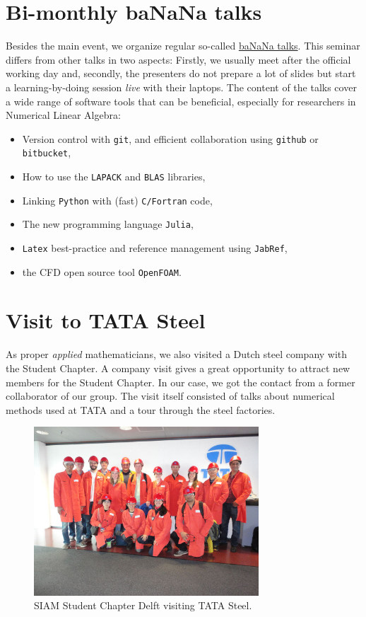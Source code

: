 \documentclass{article}
\begin{document}
 \section*{Bi-monthly ba\color{red}NaN\color{black}a talks}
 Besides the main event, we organize regular so-called \href{http://projectbanana.github.io/}{ba\color{red}NaN\color{black}a talks}. This seminar differs from other talks in two aspects: Firstly, we usually meet after the official working day and, secondly, the presenters do not prepare a lot of slides but start a learning-by-doing session \textit{live} with their laptops. The content of the talks cover a wide range of software tools that can be beneficial, especially for researchers in Numerical Linear Algebra:
  \begin{itemize}
  \item Version control with \texttt{git}, and efficient collaboration using \texttt{github} or \texttt{bitbucket},
  \item How to use the \texttt{LAPACK} and \texttt{BLAS} libraries,
  \item Linking \texttt{Python} with (fast) \texttt{C/Fortran} code,
  \item The new programming language \texttt{Julia},
  \item \texttt{Latex} best-practice and reference management using \texttt{JabRef},
  \item the CFD open source tool \texttt{OpenFOAM}.
 \end{itemize}
 \section*{Visit to TATA Steel}
 As proper \textit{applied} mathematicians, we also visited a Dutch steel company with the Student Chapter. A company visit gives a great opportunity to attract new members for the Student Chapter. In our case, we got the contact from a former collaborator of our group. The visit itself consisted of talks about numerical methods used at TATA and a tour through the steel factories.
 \begin{figure}[ht]
 \centering
  \includegraphics[width=0.75\textwidth]{DSC02054.jpg}
  \caption{SIAM Student Chapter Delft visiting TATA Steel.}
 \end{figure}
\end{document}
